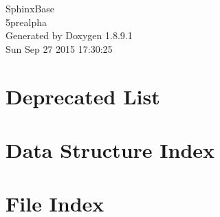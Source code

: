 \documentclass[twoside]{book}
\newcommand{\+}{\discretionary{\mbox{\scriptsize$\hookleftarrow$}}{}{}}
\newcommand{\clearemptydoublepage}{%
  \newpage{\pagestyle{empty}\cleardoublepage}%
}
\begin{document}
\begin{titlepage}
\vspace*{7cm}
\begin{center}%
{\Large Sphinx\+Base \\[1ex]\large 5prealpha }\\
\vspace*{1cm}
{\large Generated by Doxygen 1.8.9.1}\\
\vspace*{0.5cm}
{\small Sun Sep 27 2015 17:30:25}\\
\end{center}
\end{titlepage}
\clearemptydoublepage
\tableofcontents
\clearemptydoublepage
{}

\chapter{Deprecated List}
\label{deprecated}

\chapter{Data Structure Index}

\chapter{File Index}

\end{document}
